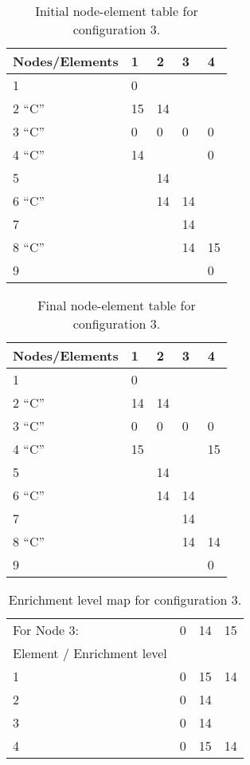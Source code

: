 \begin{table}[H]
	\centering
		\begin{tabular}{| l | p{2cm} | p{2cm} | p{2cm} | p{2cm} |}
		\hline
		Nodes/Elements & 1 & 2 & 3 & 4 \\ \hline
		1 		&  0		&		&		&		 \\ \hline
		2 ``C''	& 15		& 14	&		&		 \\ \hline
		3 ``C''	&  0		&  0	&  0	&  0	 \\ \hline
		4 ``C''	& 14		&		&		&  0 	 \\ \hline
		5		& 			& 14	&		& 		 \\ \hline
		6 ``C''	&  			& 14	& 14	&		 \\ \hline
		7		&			& 		& 14	&		 \\ \hline
		8 ``C''	&			&  		& 14	& 15	 \\ \hline
		9		&			&		&		&  0	 \\ \hline
		\end{tabular}
	\caption[Initial node-element table configuration 3]{Initial node-element table for configuration 3.}
	\label{tab:initial-node-element-table-configuration-3}
\end{table}

\begin{table}[H]
	\centering
		\begin{tabular}{| l | p{2cm} | p{2cm} | p{2cm} | p{2cm} |}
		\hline
		Nodes/Elements & 1 & 2 & 3 & 4 \\ \hline
		1 		&  0		&		&		&		 \\ \hline
		2 ``C''	& 14		& 14	&		&		 \\ \hline
		3 ``C''	&  0		&  0	&  0	&  0	 \\ \hline
		4 ``C''	& 15		&		&		& 15	 \\ \hline
		5		& 			& 14	&		& 		 \\ \hline
		6 ``C''	&  			& 14	& 14	&		 \\ \hline
		7		&			& 		& 14	&		 \\ \hline
		8 ``C''	&			&  		& 14	& 14	 \\ \hline
		9		&			&		&		&  0	 \\ \hline
		\end{tabular}
	\caption[Final node-element table for configuration 3]{Final node-element table for configuration 3.}
	\label{tab:final-node-element-table-configuration-3}
\end{table}

\begin{table}[H]
	\centering
		\begin{tabular}{| l | p{2cm} | p{2cm} | p{2cm} |}
		\hline
		For Node 3:		& 0	& 14 & 15\\
		Element / Enrichment level & & & \\ \hline
		1 & 0 & 15 & 14	\\ \hline
		2 & 0 & 14 &   	\\ \hline
		3 & 0 & 14 &   	\\ \hline
		4 & 0 & 15 & 14	\\ \hline
		\end{tabular}
	\caption[Element to enrichment table configuration 3]{Enrichment level map for configuration 3.}
	\label{tab:element-to-enrichment-table-3}
\end{table}

